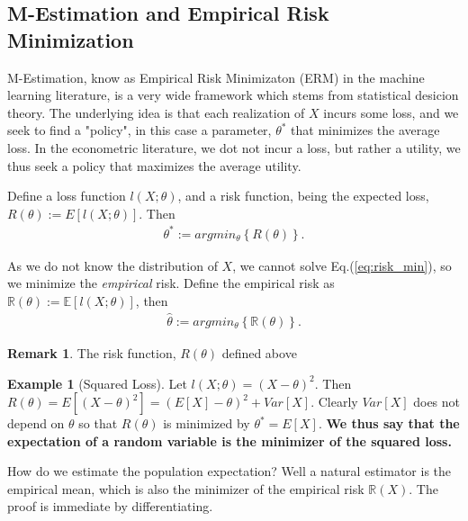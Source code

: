 \documentclass[12pt,a4paper]{article}
\theoremstyle{plain}
\theoremstyle{definition}
\newtheorem{remark}{Remark}
\newtheorem{example}{Example}
\newcommand{\expect}[1]{E\left[ #1 \right]}
\newcommand{\expectn}[1]{\mathbb{E}[#1]}
\newcommand{\loss}{l}
\newcommand{\risk}{R}
\newcommand{\riskn}{\mathbb{R}}
\newcommand{\argmin}[2]{argmin_{#1}\left\{ #2 \right\}}
\begin{document}
\subsection{M-Estimation and Empirical Risk Minimization}
\label{sec:m_estimation}

M-Estimation, know as Empirical Risk Minimizaton (ERM) in the machine learning literature, is a very wide framework which stems from statistical desicion theory.
The underlying idea is that each realization of $X$ incurs some loss, and we seek to find a "policy", in this case a parameter, $\theta^*$ that minimizes the average loss.
In the econometric literature, we dot not incur a loss, but rather a utility, we thus seek a policy that maximizes the average utility.

Define a loss function $\loss(X;\theta)$, and a risk function, being the expected loss, 
$\risk(\theta):=\expect{\loss(X;\theta)}$. Then 
\begin{align}
\label{eq:risk_min}
 \theta^*:= \argmin{\theta}{\risk(\theta)}.
\end{align}



As we do not know the distribution of $X$, we cannot solve Eq.(\ref{eq:risk_min}), so we minimize the \emph{empirical} risk. 
Define the empirical risk as $\riskn(\theta):=\expectn{\loss(X;\theta)}$, then 
\begin{align}
\label{eq:empirical_risk_min}
 \hat{\theta}:= \argmin{\theta}{\riskn(\theta)}.
\end{align}

\begin{remark}
The risk function, $\risk(\theta)$ defined above
\end{remark}



\begin{example}[Squared Loss]
Let $\loss(X;\theta)=(X-\theta)^2$. Then 
$
	\risk(\theta) = 
	\expect{(X-\theta)^2} = 
	(\expect{X}-\theta)^2 + Var[X]. 
$
Clearly $Var[X]$ does not depend on $\theta$  so that $\risk(\theta)$ is minimized by $\theta^*=\expect{X}$.
\textbf{We thus say that the expectation of a random variable is the minimizer of the squared loss.}

How do we estimate the population expectation? Well a natural estimator is the empirical mean, which is also the minimizer of the empirical risk $\riskn(X)$. The proof is immediate by differentiating. 
\end{example}
\end{document}
